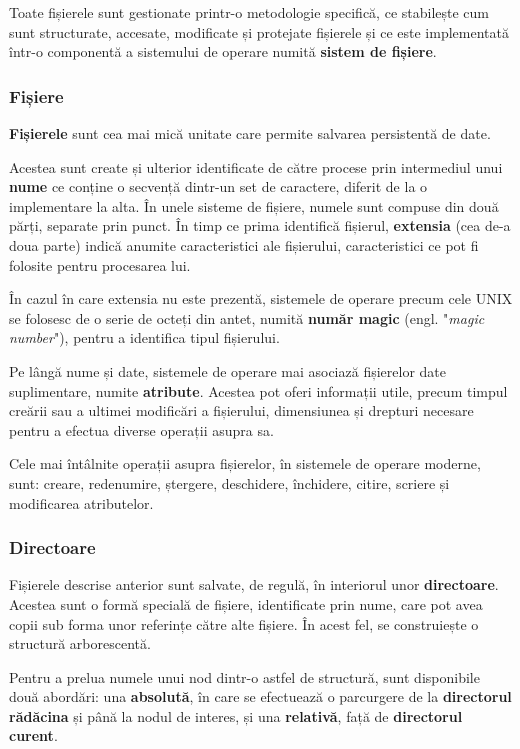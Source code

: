 \documentclass[../../main.tex]{subfiles}
\begin{document}
Toate fișierele sunt gestionate printr-o metodologie specifică, ce stabilește cum sunt structurate, accesate, modificate și protejate fișierele și ce este implementată într-o componentă a sistemului de operare numită \textbf{sistem de fișiere}.

\subsubsection{Fișiere}

\textbf{Fișierele} sunt cea mai mică unitate care permite salvarea persistentă de date.

Acestea sunt create și ulterior identificate de către procese prin intermediul unui \textbf{nume} ce conține o secvență dintr-un set de caractere, diferit de la o implementare la alta. În unele sisteme de fișiere, numele sunt compuse din două părți, separate prin punct. În timp ce prima identifică fișierul, \textbf{extensia} (cea de-a doua parte) indică anumite caracteristici ale fișierului, caracteristici ce pot fi folosite pentru procesarea lui.

În cazul în care extensia nu este prezentă, sistemele de operare precum cele UNIX se folosesc de o serie de octeți din antet, numită \textbf{număr magic} (engl. "\textit{magic number}"), pentru a identifica tipul fișierului.

Pe lângă nume și date, sistemele de operare mai asociază fișierelor date suplimentare, numite \textbf{atribute}. Acestea pot oferi informații utile, precum timpul creării sau a ultimei modificări a fișierului, dimensiunea și drepturi necesare pentru a efectua diverse operații asupra sa.

Cele mai întâlnite operații asupra fișierelor, în sistemele de operare mo\-derne, sunt: creare, redenumire, ștergere, deschidere, închidere, citire, scriere și modificarea atributelor.

\subsubsection{Directoare}

Fișierele descrise anterior sunt salvate, de regulă, în interiorul unor \textbf{directoare}. Acestea sunt o formă specială de fișiere, identificate prin nume, care pot avea copii sub forma unor referințe către alte fișiere. În acest fel, se construiește o structură arborescentă.

Pentru a prelua numele unui nod dintr-o astfel de structură, sunt disponibile două abordări: una \textbf{absolută}, în care se efectuează o parcurgere de la \textbf{directorul rădăcina} și până la nodul de interes, și una \textbf{relativă}, față de \textbf{directorul curent}.
\end{document}
